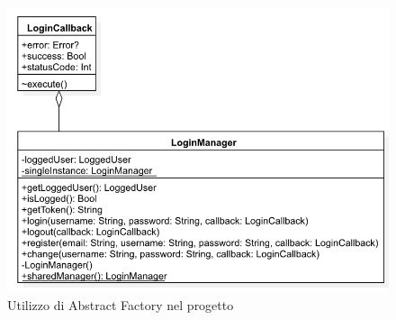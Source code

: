 \begin{itemize}
			 	\begin{figure}[!h]
			 		\centering
			 		\includegraphics[scale=0.4]{img/package/png/client--loginmanager}  
			 		\caption{Utilizzo di Abstract Factory nel progetto}
			 	\end{figure}
			 
		\end{itemize}
		
		
		
